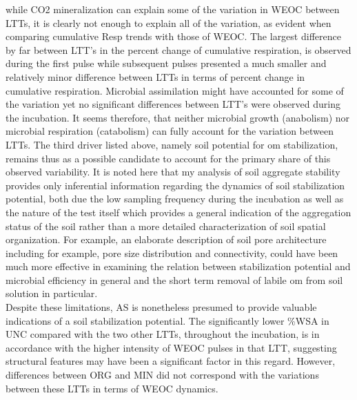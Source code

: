 	while  CO2 mineralization can explain some of the variation in WEOC between LTTs, it is clearly not enough to explain all of the variation, as evident when comparing cumulative Resp trends with those of WEOC. The largest difference by far between LTT's in the percent change of cumulative respiration, is observed during the first pulse while subsequent pulses presented a much smaller and relatively minor difference between LTTs in terms of percent change in cumulative respiration.
	Microbial assimilation might have accounted for some of the variation yet no significant differences between LTT's were observed during the incubation.
	It seems therefore, that neither microbial growth (anabolism) nor microbial respiration (catabolism) can fully account for the variation between LTTs. The third driver listed above, namely soil potential for \gls{om} stabilization, remains thus as a possible candidate to account for the primary share of this observed variability. It is noted here that my analysis of soil aggregate stability provides only inferential information regarding the dynamics of soil stabilization potential, both due the low sampling frequency during the incubation as well as the nature of the test itself which provides a general indication of the aggregation status of the soil rather than a more detailed characterization of soil spatial organization. For example, an elaborate description of soil pore architecture including for example, pore size distribution and connectivity, could have been much more effective in examining the relation between stabilization potential and microbial efficiency in general and the short term removal of labile \gls{om} from soil solution in particular. \\
	Despite these limitations, AS is nonetheless presumed to provide valuable indications of a soil stabilization potential. The significantly lower \%WSA in UNC compared with the two other LTTs, throughout the incubation, is in accordance with the higher intensity of WEOC pulses in that LTT, suggesting structural features may have been a significant factor in this regard. However, differences between ORG and MIN did not correspond with the variations between these LTTs in terms of WEOC dynamics.  \\


